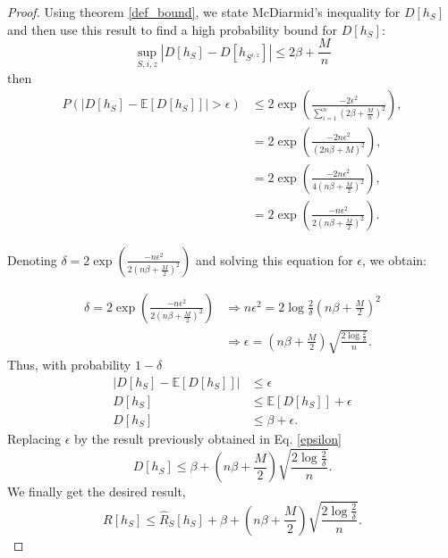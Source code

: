 \documentclass{article}
\begin{document}
\begin{proof}
Using theorem \ref{def_bound}, we state McDiarmid's inequality for $D[h_S]$ and then use this result to find a high probability bound for $D[h_S]$:
\begin{equation}
\sup_{S, i, z} |D[h_S] - D[h_{S^{i, z}}]| \leq 2\beta + \frac{M}{n}
\end{equation}
then 
\begin{equation}
\begin{split}
P(|D[h_S] - \mathbb{E}[D[h_S]]| > \epsilon) & \leq 2\exp \left(\frac{-2\epsilon^2}{\sum_{i=1}^{n}  \left( 2\beta + \frac{M}{n} \right)^2 } \right), \\
& = 2\exp \left(\frac{-2n\epsilon^2}{\left( 2n\beta + M \right)^2 } \right), \\
& = 2\exp \left(\frac{-2n\epsilon^2}{4\left(n\beta + \frac{M}{2} \right)^2 } \right), \\
& = 2\exp \left(\frac{-n\epsilon^2}{2\left(n\beta + \frac{M}{2} \right)^2 } \right).
\end{split}
\end{equation}

Denoting $\delta = 2\exp \left(\frac{-n\epsilon^2}{2\left(n\beta + \frac{M}{2} \right)^2 } \right)$ and solving this equation for $\epsilon$, we obtain:

\begin{equation}\label{epsilon}
\begin{split}
\delta = 2\exp \left(\frac{-n\epsilon^2}{2\left(n\beta + \frac{M}{2} \right)^2 } \right) & \Rightarrow n\epsilon^2 = 2\log\frac{2}{\delta}\left(n\beta + \frac{M}{2} \right)^2 \\
& \Rightarrow \epsilon = \left(n\beta + \frac{M}{2} \right) \sqrt{\frac{2\log\frac{2}{\delta}}{n}}.
\end{split}
\end{equation}
Thus, with probability $1-\delta$ 
\begin{equation*}
\begin{split}
|D[h_S] - \mathbb{E}[D[h_S]]| &\leq \epsilon \\
D[h_S] &\leq \mathbb{E}[D[h_S]] + \epsilon \\
D[h_S] &\leq \beta + \epsilon.
\end{split}
\end{equation*}
Replacing $\epsilon$ by the result previously obtained in Eq. \ref{epsilon}
\begin{equation}
D[h_S] \leq \beta + \left(n\beta + \frac{M}{2} \right) \sqrt{\frac{2\log\frac{2}{\delta}}{n}}.
\end{equation}
We finally get the desired result,
\begin{equation}
R[h_S] \leq \hat{R}_S[h_S] + \beta + \left(n\beta + \frac{M}{2} \right) \sqrt{\frac{2\log\frac{2}{\delta}}{n}}.
\end{equation}
\end{proof}
\end{document}
